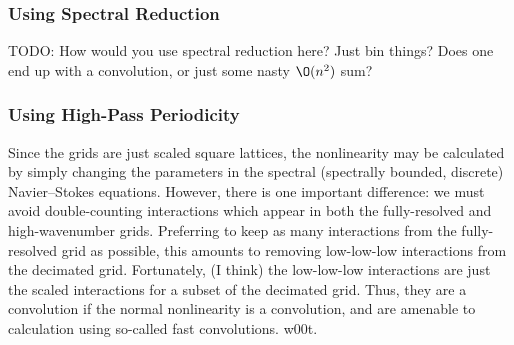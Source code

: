 \documentclass[10pt,showpacs,showkeys,%
amsfonts,amsmath,onecolumn,
floatfix,aps,superscriptaddress]{revtex4}
\begin{document}
\subsubsection{Using Spectral Reduction}

TODO: How would you use spectral reduction here?  Just bin things?
Does one end up with a convolution, or just some nasty $\O(n^2)$ sum?

\subsubsection{Using High-Pass Periodicity}

Since the grids are just scaled square lattices, the nonlinearity may
be calculated by simply changing the parameters in the spectral
(spectrally bounded, discrete) Navier--Stokes equations.  However,
there is one important difference: we must avoid double-counting
interactions which appear in both the fully-resolved and
high-wavenumber grids.  Preferring to keep as many interactions from
the fully-resolved grid as possible, this amounts to removing
low-low-low interactions from the decimated grid.  Fortunately, (I
think) the low-low-low interactions are just the scaled interactions
for a subset of the decimated grid.  Thus, they are a convolution if
the normal nonlinearity is a convolution, and are amenable to
calculation using so-called fast convolutions.  w00t.
\end{document}
